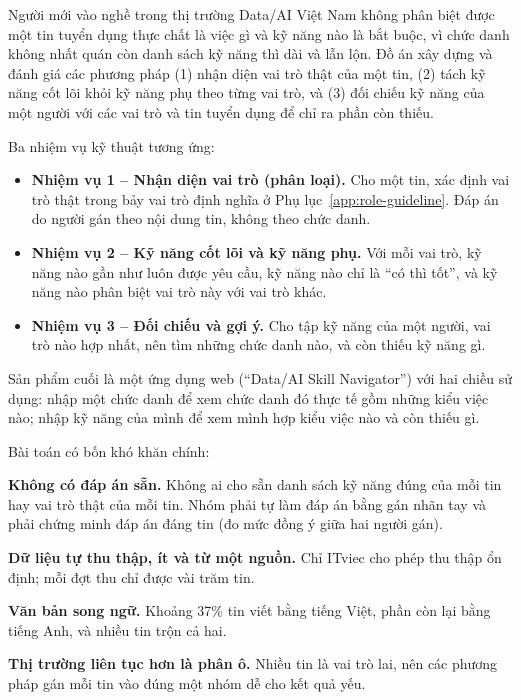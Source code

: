 \documentclass[12pt]{article}
\begin{document}
\begin{tcolorbox}[colback=gray!5, colframe=black!40, boxrule=0.5pt, arc=1pt]
Người mới vào nghề trong thị trường Data/AI Việt Nam không phân biệt được một tin tuyển dụng thực chất là việc gì và kỹ năng nào là bắt buộc, vì chức danh không nhất quán còn danh sách kỹ năng thì dài và lẫn lộn. Đồ án xây dựng và đánh giá các phương pháp (1) nhận diện vai trò thật của một tin, (2) tách kỹ năng cốt lõi khỏi kỹ năng phụ theo từng vai trò, và (3) đối chiếu kỹ năng của một người với các vai trò và tin tuyển dụng để chỉ ra phần còn thiếu.
\end{tcolorbox}

Ba nhiệm vụ kỹ thuật tương ứng:
\begin{itemize}[noitemsep, topsep=2pt, leftmargin=2.5em]
\item \textbf{Nhiệm vụ 1 -- Nhận diện vai trò (phân loại).} Cho một tin, xác định vai trò thật trong bảy vai trò định nghĩa ở Phụ lục~\ref{app:role-guideline}. Đáp án do người gán theo nội dung tin, không theo chức danh.
\item \textbf{Nhiệm vụ 2 -- Kỹ năng cốt lõi và kỹ năng phụ.} Với mỗi vai trò, kỹ năng nào gần như luôn được yêu cầu, kỹ năng nào chỉ là ``có thì tốt'', và kỹ năng nào phân biệt vai trò này với vai trò khác.
\item \textbf{Nhiệm vụ 3 -- Đối chiếu và gợi ý.} Cho tập kỹ năng của một người, vai trò nào hợp nhất, nên tìm những chức danh nào, và còn thiếu kỹ năng gì.
\end{itemize}

Sản phẩm cuối là một ứng dụng web (``Data/AI Skill Navigator'') với hai chiều sử dụng: nhập một chức danh để xem chức danh đó thực tế gồm những kiểu việc nào; nhập kỹ năng của mình để xem mình hợp kiểu việc nào và còn thiếu gì.

Bài toán có bốn khó khăn chính:

\textbf{Không có đáp án sẵn.} Không ai cho sẵn danh sách kỹ năng đúng của mỗi tin hay vai trò thật của mỗi tin. Nhóm phải tự làm đáp án bằng gán nhãn tay và phải chứng minh đáp án đáng tin (đo mức đồng ý giữa hai người gán).

\textbf{Dữ liệu tự thu thập, ít và từ một nguồn.} Chỉ ITviec cho phép thu thập ổn định; mỗi đợt thu chỉ được vài trăm tin.

\textbf{Văn bản song ngữ.} Khoảng 37\% tin viết bằng tiếng Việt, phần còn lại bằng tiếng Anh, và nhiều tin trộn cả hai.

\textbf{Thị trường liên tục hơn là phân ô.} Nhiều tin là vai trò lai, nên các phương pháp gán mỗi tin vào đúng một nhóm dễ cho kết quả yếu.
\end{document}
